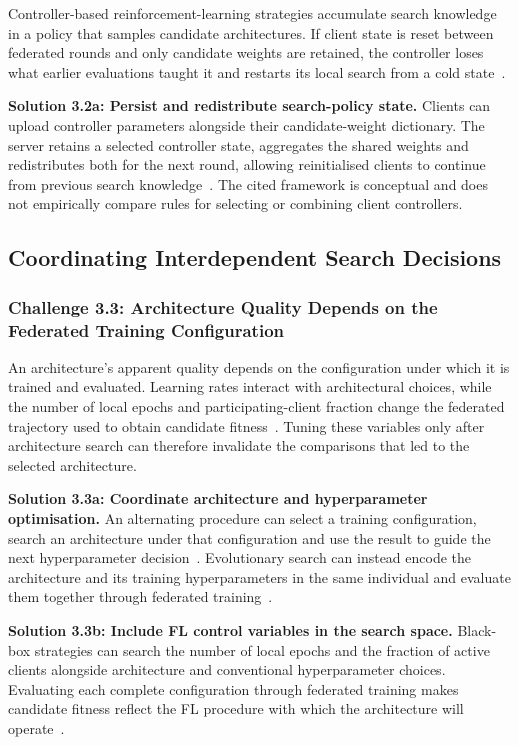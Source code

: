 Controller-based reinforcement-learning strategies accumulate search knowledge in a policy that samples candidate architectures. If client state is reset between federated rounds and only candidate weights are retained, the controller loses what earlier evaluations taught it and restarts its local search from a cold state~\cite{efficient_model_training_fednas_2024}.

\noindent\textbf{Solution 3.2a: Persist and redistribute search-policy state.} Clients can upload controller parameters alongside their candidate-weight dictionary. The server retains a selected controller state, aggregates the shared weights and redistributes both for the next round, allowing reinitialised clients to continue from previous search knowledge~\cite{efficient_model_training_fednas_2024}. The cited framework is conceptual and does not empirically compare rules for selecting or combining client controllers.

\subsection{Coordinating Interdependent Search Decisions}

\subsubsection{Challenge 3.3: Architecture Quality Depends on the Federated Training Configuration}

An architecture's apparent quality depends on the configuration under which it is trained and evaluated. Learning rates interact with architectural choices, while the number of local epochs and participating-client fraction change the federated trajectory used to obtain candidate fitness~\cite{feathers_2023,aging_fednas_2025,breastcancer_fednas_2024}. Tuning these variables only after architecture search can therefore invalidate the comparisons that led to the selected architecture.

\noindent\textbf{Solution 3.3a: Coordinate architecture and hyperparameter optimisation.} An alternating procedure can select a training configuration, search an architecture under that configuration and use the result to guide the next hyperparameter decision~\cite{feathers_2023}. Evolutionary search can instead encode the architecture and its training hyperparameters in the same individual and evaluate them together through federated training~\cite{aging_fednas_2025}.

\noindent\textbf{Solution 3.3b: Include FL control variables in the search space.} Black-box strategies can search the number of local epochs and the fraction of active clients alongside architecture and conventional hyperparameter choices. Evaluating each complete configuration through federated training makes candidate fitness reflect the FL procedure with which the architecture will operate~\cite{breastcancer_fednas_2024}.

